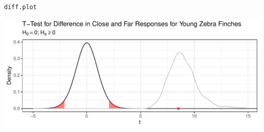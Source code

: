 \documentclass{article}\usepackage[]{graphicx}\usepackage[]{xcolor}
\makeatletter
\def\maxwidth{ %
  \ifdim\Gin@nat@width>\linewidth
    \linewidth
  \else
    \Gin@nat@width
  \fi
}
\newcommand{\hldef}[1]{\textcolor[rgb]{0.345,0.345,0.345}{#1}}%
\newenvironment{kframe}{%
 \def\at@end@of@kframe{}%
 \ifinner\ifhmode%
  \def\at@end@of@kframe{\end{minipage}}%
  \begin{minipage}{\columnwidth}%
 \fi\fi%
 \def\FrameCommand##1{\hskip\@totalleftmargin \hskip-\fboxsep
 \colorbox{shadecolor}{##1}\hskip-\fboxsep
     \hskip-\linewidth \hskip-\@totalleftmargin \hskip\columnwidth}%
 \MakeFramed {\advance\hsize-\width
   \@totalleftmargin\z@ \linewidth\hsize
   \@setminipage}}%
 {\par\unskip\endMakeFramed%
 \at@end@of@kframe}
\newenvironment{knitrout}{}{} %
\makeatother
\begin{document}
\begin{enumerate}
\begin{enumerate}
\begin{knitrout}
\begin{kframe}
\begin{alltt}
\hldef{diff.plot}
\end{alltt}
\end{kframe}
\includegraphics[width=\maxwidth]{figure/unnamed-chunk-10-1} 
\end{knitrout}
\end{enumerate}
\end{enumerate}



\end{document}
